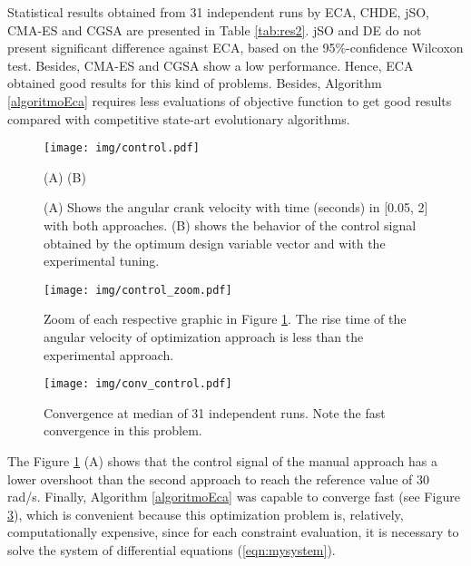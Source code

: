 \documentclass[12pt,letterpape]{article}
\begin{document}
Statistical results obtained from 31 independent runs by ECA, CHDE, jSO,
CMA-ES and CGSA are presented in Table \ref{tab:res2}. jSO and DE do not present
significant difference against ECA, based on the 95\%-confidence Wilcoxon test.
Besides, CMA-ES and CGSA show a low performance. Hence, ECA obtained good results
for this kind of problems. Besides, Algorithm \ref{algoritmoEca} requires less
evaluations of objective function to get good results compared with competitive
state-art evolutionary algorithms.\\



% 
% 
% 
\begin{figure}[!ht]
	\centering
	\texttt{[image: img/control.pdf]}
	\begin{center}
		(A) \hspace{0.4\linewidth} (B)
	\end{center}
	\caption{(A) Shows the angular crank velocity with time (seconds) in [0.05, 2]
	with both approaches. (B) shows the behavior of the control signal obtained
	by the optimum design variable vector and with the experimental tuning.}
	\label{fig:tunning}
\end{figure}
% 
% 
% 
\begin{figure}[!ht]
	\centering
	\texttt{[image: img/control\_zoom.pdf]}
	\caption{Zoom of each respective graphic in Figure \ref{fig:tunning}. The
	rise time of the angular velocity of optimization approach is less than the
	experimental approach.}
	\label{fig:tunningZoom}
\end{figure}
% 
% 
\begin{figure}[!ht]
	\centering
	\texttt{[image: img/conv\_control.pdf]}
	\caption{Convergence at median of 31 independent runs. Note the fast convergence
	in this problem.}
	\label{fig:convMedian2}
\end{figure}

The Figure \ref{fig:tunning} (A) shows that the control signal of the manual
approach has a lower overshoot than the second approach to reach the reference
value of 30 rad/s.
% 
Finally, Algorithm \ref{algoritmoEca} was capable to converge fast (see Figure \ref{fig:convMedian2}),
which is convenient because this optimization problem is, relatively,
computationally expensive, since for each constraint evaluation, it is necessary
to solve the system of differential equations (\ref{eqn:mysystem}).
\end{document}
